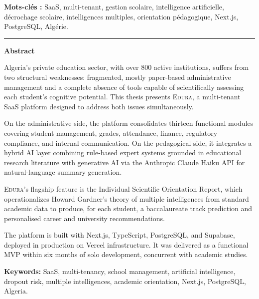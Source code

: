 \documentclass[12pt,a4paper,oneside]{report}
\newcommand{\edura}{\textsc{Edura}}
\begin{document}
\vspace{10pt}
\noindent\textbf{Mots-clés :} SaaS, multi-tenant, gestion scolaire, intelligence artificielle, décrochage scolaire, intelligences multiples, orientation pédagogique, Next.js, PostgreSQL, Algérie.

\vspace{20pt}
\noindent\rule{\linewidth}{0.4pt}

\vspace{10pt}
\noindent\textbf{Abstract}

\vspace{6pt}
Algeria's private education sector, with over 800 active institutions, suffers from two structural weaknesses: fragmented, mostly paper-based administrative management and a complete absence of tools capable of scientifically assessing each student's cognitive potential. This thesis presents \edura{}, a multi-tenant SaaS platform designed to address both issues simultaneously.

On the administrative side, the platform consolidates thirteen functional modules covering student management, grades, attendance, finance, regulatory compliance, and internal communication. On the pedagogical side, it integrates a hybrid AI layer combining rule-based expert systems grounded in educational research literature with generative AI via the Anthropic Claude Haiku API for natural-language summary generation.

\edura{}'s flagship feature is the Individual Scientific Orientation Report, which operationalizes Howard Gardner's theory of multiple intelligences from standard academic data to produce, for each student, a baccalaureate track prediction and personalised career and university recommendations.

The platform is built with Next.js, TypeScript, PostgreSQL, and Supabase, deployed in production on Vercel infrastructure. It was delivered as a functional MVP within six months of solo development, concurrent with academic studies.

\vspace{10pt}
\noindent\textbf{Keywords:} SaaS, multi-tenancy, school management, artificial intelligence, dropout risk, multiple intelligences, academic orientation, Next.js, PostgreSQL, Algeria.

\tableofcontents

\listoffigures
{}

\listoftables
{}
\end{document}
